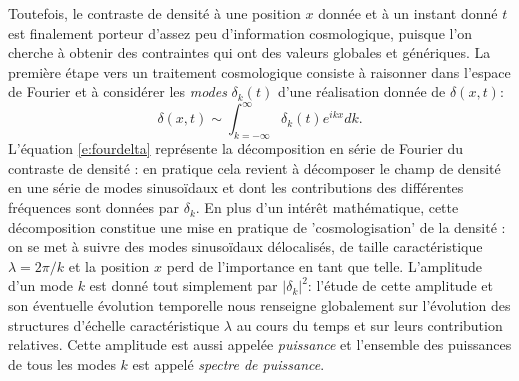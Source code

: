 Toutefois, le contraste de densité à une position $x$ donnée et à un instant donné $t$ est finalement porteur d'assez peu d'information cosmologique, puisque l'on cherche à obtenir des contraintes qui ont des valeurs globales et génériques. La première étape vers un traitement cosmologique consiste à raisonner dans l'espace de Fourier et à considérer les \textit{modes} $\delta_k(t)$ d'une réalisation donnée de $\delta(x,t)$:
\begin{equation}
\delta(x,t)\sim\int_{k=-\infty}^\infty \delta_k(t) e^{ikx} dk.
\label{e:fourdelta}
\end{equation}
L'équation \ref{e:fourdelta} représente la décomposition en série de Fourier du contraste de densité : en pratique cela revient à décomposer le champ de densité en une série de modes sinusoïdaux et dont les contributions des différentes fréquences sont données par $\delta_k$. En plus d'un intérêt mathématique, cette décomposition constitue une mise en pratique de 'cosmologisation' de la densité : on se met à suivre des modes sinusoïdaux délocalisés, de taille caractéristique $\lambda=2\pi/k$ et la position $x$ perd de l'importance en tant que telle. L'amplitude d'un mode $k$ est donné tout simplement par $|\delta_k|^2$: l'étude de cette amplitude et son éventuelle évolution temporelle nous renseigne globalement sur l'évolution des structures d'échelle caractéristique $\lambda$ au cours du temps et sur leurs contribution relatives. Cette amplitude est aussi appelée \textit{puissance} et l'ensemble des puissances de tous les modes $k$ est appelé \textit{spectre de puissance}.

